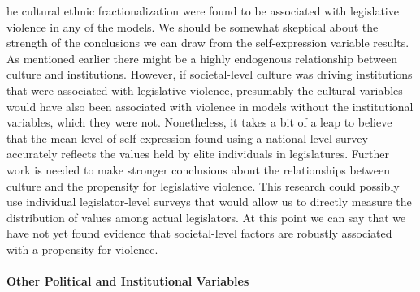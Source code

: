 \documentclass[a4paper]{article}\usepackage[]{graphicx}\usepackage[]{color}
\begin{document}
he cultural  ethnic fractionalization were  found to be associated with legislative violence in any of the models.   We should be somewhat skeptical about the strength of the conclusions we can draw from the self-expression variable results. As mentioned earlier there might be a highly endogenous relationship between culture and institutions. However, if societal-level culture was driving institutions that were associated with legislative violence, presumably the cultural variables would have also been associated with violence in models without the institutional variables, which they were not. Nonetheless, it takes a bit of a leap to believe that the mean level of self-expression found using a national-level survey accurately reflects the values held by elite individuals in legislatures. Further work is needed to make stronger conclusions about the relationships between culture and the propensity for legislative violence. This research could possibly use individual legislator-level surveys that would allow us to directly measure the distribution of values among actual legislators. At this point we can say that we have not yet found evidence that societal-level factors are robustly associated with a propensity for violence.

\paragraph{Other Political and Institutional Variables}
\end{document}
